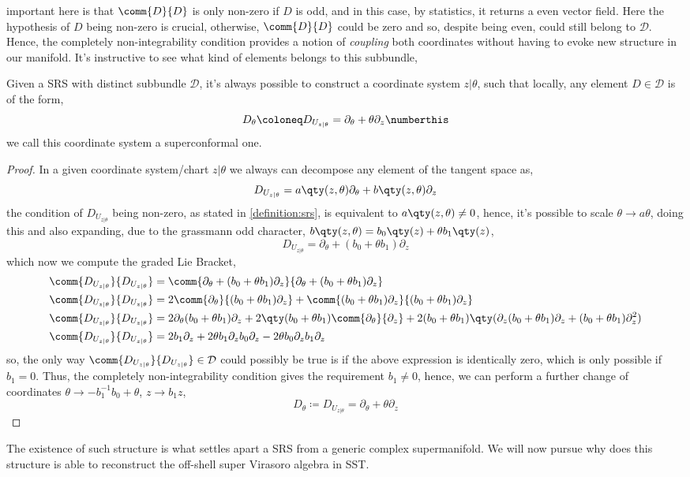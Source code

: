 important here is that $\comm{D}{D}$ is only non-zero if $D$ is odd, and in this case, by statistics, it returns 
a even vector field. Here the hypothesis of $D$ being non-zero is crucial, otherwise, $\comm{D}{D}$ could be 
zero and so, despite being even, could still belong to $\mathcal D$. Hence, the completely non-integrability 
condition provides a notion of \textit{coupling} both coordinates without having to evoke new structure in 
our manifold. It's instructive to see what kind of elements belongs to this subbundle,
\begin{lemma}
    Given a SRS with distinct subbundle $\mathcal D$, it's always possible to construct a 
    coordinate system $z|\theta$, such that locally, any element $D\in\mathcal D$ is of the 
    form, \[D_\theta\coloneq D_{U_{z|\theta}}=\partial_\theta+\theta\partial_z\numberthis\label{covariantderivative}\] we call 
    this coordinate system a superconformal one.
\end{lemma}
\begin{proof}
    In a given coordinate system/chart $z|\theta$ we always can decompose any element of the tangent space as,
    $$D_{U_{z|\theta}}=a\qty(z,\theta)\partial_\theta+b\qty(z,\theta)\partial_z$$ the condition of $D_{U_{z|\theta}}$ being 
    non-zero, as stated in \cref{definition:srs}, is equivalent to $a\qty(z,\theta)\neq 0$, hence, it's possible to scale 
    $\theta\rightarrow a\theta$, doing this and also expanding, due to the grassmann odd character, 
    $b\qty(z,\theta)=b_0\qty(z)+\theta b_1\qty(z)$, 
    $$D_{U_{z|\theta}}=\partial_\theta+(b_0+\theta b_1)\partial_z$$ which now we compute the graded Lie Bracket,
    \begin{align*}
        \comm{D_{U_{z|\theta}}}{D_{U_{z|\theta}}}&=\comm{\partial_\theta+(b_0+\theta b_1)\partial_z}{\partial_\theta+(b_0+\theta b_1)\partial_z}\\
        \comm{D_{U_{z|\theta}}}{D_{U_{z|\theta}}}&=2\comm{\partial_\theta}{(b_0+\theta b_1)\partial_z}+\comm{(b_0+\theta b_1)\partial_z}{(b_0+\theta b_1)\partial_z}\\
        \comm{D_{U_{z|\theta}}}{D_{U_{z|\theta}}}&=2\partial_\theta(b_0+\theta b_1)\partial_z+2\qty(b_0+\theta b_1)\comm{\partial_\theta}{\partial_z}+2(b_0+\theta b_1)\qty(\partial_z(b_0+\theta b_1)\partial_z+(b_0+\theta b_1)\partial^2_z)\\
        \comm{D_{U_{z|\theta}}}{D_{U_{z|\theta}}}&=2b_1\partial_z+2\theta b_1\partial_z b_0\partial_z-2\theta b_0\partial_z b_1\partial_z
    \end{align*}
    so, the only way $\comm{D_{U_{z|\theta}}}{D_{U_{z|\theta}}}\in\mathcal D$ could possibly be true is if the above expression is identically zero, which is 
    only possible if $b_1=0$. Thus, the completely non-integrability condition gives the requirement $b_1\neq 0$, hence, we can perform a 
    further change of coordinates $\theta\rightarrow -b_1^{-1}b_0+\theta$, $z\rightarrow b_1 z$,
    $$D_{\theta}\coloneq D_{U_{z|\theta}}=\partial_\theta+\theta \partial_z$$
\end{proof}
The existence of such structure is what settles apart a SRS from a generic complex supermanifold. We will now pursue 
why does this structure is able to reconstruct the off-shell super Virasoro algebra in SST.

